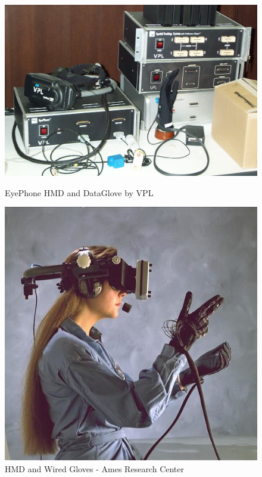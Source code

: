 \begin{figure}[!htb]
  \includegraphics[width=\linewidth]{img/eyephone-dataglove.jpg}
  \caption{EyePhone HMD and DataGlove by VPL \cite{FileVPLE81online}}
  \label{fig:eyephone}
\endminipage\hfill
{}
  \includegraphics[width=\linewidth]{img/hmd-ames.jpg}
  \caption{HMD and Wired Gloves - Ames Research Center \cite{FileHead94online}}
  \label{fig:hmd-ames}
\endminipage
\end{figure}

